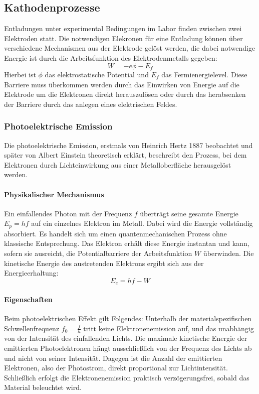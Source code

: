\subsection{Kathodenprozesse}
Entladungen unter experimental Bedingungen im Labor finden zwischen zwei Elektroden statt. Die notwendigen Elekronen für eine Entladung können über verschiedene Mechanismen aus der Elektrode gelöst werden, die dabei notwendige Energie ist durch die Arbeitsfunktion des Elektrodenmetalls gegeben:
\begin{equation}
    W = -e \phi - E_f
\end{equation}
Hierbei ist \(\phi\) das elektrostatische Potential und \(E_f\) das Fermienergielevel. Diese Barriere muss überkommen werden durch das Einwirken von Energie auf die Elektrode um die Elektronen direkt herauszulösen oder durch das herabsenken der Barriere durch das anlegen eines elektrischen Feldes.
\subsubsection{Photoelektrische Emission}
Die photoelektrische Emission, erstmals von Heinrich Hertz 1887 beobachtet und später von Albert Einstein theoretisch erklärt, beschreibt den Prozess, bei dem Elektronen durch Lichteinwirkung aus einer Metalloberfläche herausgelöst werden.
\paragraph{Physikalischer Mechanismus}
Ein einfallendes Photon mit der Frequenz \(f\) überträgt seine gesamte Energie \(E_p = hf\) auf ein einzelnes Elektron im Metall. Dabei wird die Energie vollständig absorbiert. Es handelt sich um einen quantenmechanischen Prozess ohne klassische Entsprechung. Das Elektron erhält diese Energie instantan und kann, sofern sie ausreicht, die Potentialbarriere der Arbeitsfunktion \(W\) überwinden. Die kinetische Energie des austretenden Elektrons ergibt sich aus der Energieerhaltung: 
\begin{equation}
    E_e = hf - W
\end{equation}
\paragraph{Eigenschaften}
Beim photoelektrischen Effekt gilt Folgendes: Unterhalb der materialspezifischen Schwellenfrequenz \(f_0 = \frac{f}{h}\) tritt keine Elektronenemission auf, und das unabhängig von der Intensität des einfallenden Lichts. Die maximale kinetische Energie der emittierten Photoelektronen hängt ausschließlich von der Frequenz des Lichts ab und nicht von seiner Intensität. Dagegen ist die Anzahl der emittierten Elektronen, also der Photostrom, direkt proportional zur Lichtintensität. Schließlich erfolgt die Elektronenemission praktisch verzögerungsfrei, sobald das Material beleuchtet wird. \cite{cooray2014}
